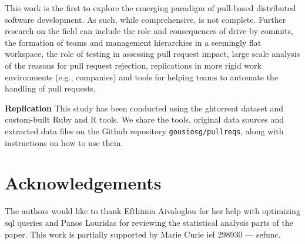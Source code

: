 \documentclass{sig-alternate}
\begin{document}
This work is the first to explore the emerging paradigm of pull-based
distributed software development. As such, while comprehensive, is not complete.
Further research on the field can include the role and consequences of drive-by
commits, the formation of teams and management hierarchies in a seemingly flat
workspace, the role of testing in assessing pull request impact, large scale
analysis of the reasons for pull request rejection,
replications in more rigid work environments (e.g., companies) and tools for
helping teams to automate the handling of pull requests.

{\bfseries Replication} This study has been conducted using the {\sc ght}orrent
dataset and custom-built Ruby and R tools. We share the tools, original data
sources and extracted data files on the Github repository
\texttt{gousiosg\-/\-pullreqs}, along with instructions on how to use them.

\section*{Acknowledgements}

The authors would like to thank Efthimia Aivaloglou for her help with 
optimizing {\sc sql} queries and Panos Louridas for reviewing the 
statistical analysis parts of the paper.
This work is partially supported by Marie Curie {\sc ief} 298930 --- {\sc sefunc}.


\balance
\begin{small}
  
\end{small}
\end{document}
